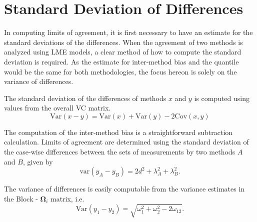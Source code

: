 \documentclass[12pt, a4paper]{report}
\theoremstyle{plain}
\theoremstyle{definition}
\theoremstyle{remark}
\begin{document}






\section{Standard Deviation of Differences}
In computing limits of agreement, it is first necessary to have an estimate for the standard deviations of the differences. When the agreement of two methods is analyzed using LME models, a clear method of how to compute the standard deviation is required. As the estimate for inter-method bias and the quantile would be the same for both methodologies, the focus hereon is solely on the variance of differences.

The standard deviation of the differences of methods $x$ and $y$ is computed using values from the overall VC matrix.
\[
\mbox{Var}(x - y ) = \mbox{Var} ( x )  + \mbox{Var} ( y ) - 2\mbox{Cov} ( x ,y )
\]

The computation of the inter-method bias is a straightforward subtraction calculation. Limits of agreement are determined using the standard deviation of the case-wise differences between the sets of measurements by two methods $A$ and $B$, given by
 \begin{equation}
 \mbox{var} (y_{A}-y_{B}) = 2d^2 + \lambda^2_{A}+ \lambda^2_{B}.
 \end{equation}
 
 The variance of differences is easily computable from the variance estimates in the ${\mbox{Block - }\boldsymbol \Omega_{i}}$ matrix, i.e.
\[
\mathrm{Var}(y_1 - y_2) = \sqrt{ \omega^2_1 + \omega^2_2 - 2\omega_{12}}.
\]
\end{document}
